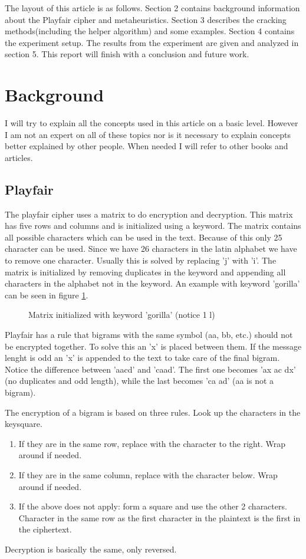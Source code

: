 \documentclass[]{article}
\begin{document}
The layout of this article is as follows. Section 2 contains background information about the Playfair cipher and metaheuristics. Section 3 describes the cracking methods(including the helper algorithm) and some examples. Section 4 contains the experiment setup. The results from the experiment are given and analyzed in section 5. This report will finish with a conclusion and future work.
\section{Background}
I will try to explain all the concepts used in this article on a basic level. However I am not an expert on all of these topics nor is it necessary to explain concepts better explained by other people. When needed I will refer to other books and articles.
\subsection{Playfair}
The playfair cipher uses a matrix to do encryption and decryption. This matrix has five rows and columns and is initialized using a keyword. The matrix contains all possible characters which can be used in the text. Because of this only 25 character can be used. Since we have 26 characters in the latin alphabet we have to remove one character. Usually this is solved by replacing 'j' with 'i'. The matrix is initialized by removing duplicates in the keyword and appending all characters in the alphabet not in the keyword. An example with keyword 'gorilla' can be seen in figure \ref{fig:keyword}.
\begin{figure}
	\label{fig:keyword}
	\caption{Matrix initialized with keyword 'gorilla' (notice 1 l)}
\end{figure} 
Playfair has a rule that bigrams with the same symbol (aa, bb, etc.) should not be encrypted together.
To solve this an 'x' is placed between them. If the message lenght is odd an 'x' is appended to the text to take care of the final bigram. Notice the difference between 'aacd' and 'caad'. The first one becomes 'ax ac dx' (no duplicates and odd length), while the last becomes 'ca ad' (aa is not a bigram).

The encryption of a bigram is based on three rules. Look up the characters in the keysquare. 
\begin{enumerate}
	\item If they are in the same row, replace with the character to the right. Wrap around if needed.
	\item If they are in the same column, replace with the character below. Wrap around if needed.
	\item If the above does not apply: form a square and use the other 2 characters. Character in the same row as the first character in the plaintext is the first in the ciphertext.
\end{enumerate}
Decryption is basically the same, only reversed. 
\end{document}

